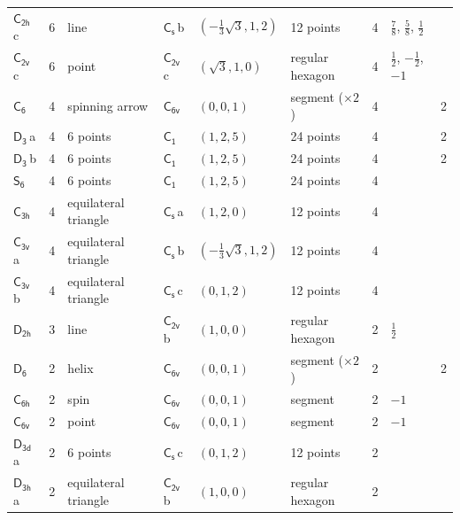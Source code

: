 \documentclass[10pt,a4paper]{article}
\numberwithin{equation}{section}
\newcommand{\grp}[1]{\mathsf{#1}}
\newcommand{\clsletter}[1]{\,{\scriptsize\color{black!55}#1}}
\newlength{\fillwidth}\newlength{\cellwidth}\newlength{\colwidth}
\begin{document}
{{\begin{longtable}{@{}lrllllr>{\RaggedRight\arraybackslash}p{\fillwidth}r@{}}
\href{C2h.pdf}{$\grp{C_{2h}}$}\clsletter{c} & 6 & line & \href{C1v.pdf}{$\grp{C_{s}}$}\clsletter{b} & $(-\tfrac{1}{3}\sqrt{3}, 1, 2)$ & 12 points & 4 & ${\tfrac{7}{8}}$, ${\tfrac{5}{8}}$, ${\tfrac{1}{2}}$ & \\
\href{C2v.pdf}{$\grp{C_{2v}}$}\clsletter{c} & 6 & point & \href{C2v.pdf}{$\grp{C_{2v}}$}\clsletter{c} & $(\sqrt{3}, 1, 0)$ & regular hexagon & 4 & ${\tfrac{1}{2}}$, ${-\tfrac{1}{2}}$, ${-1}$ & \\
\href{C6.pdf}{$\grp{C_{6}}$} & 4 & spinning arrow & \href{C6v.pdf}{$\grp{C_{6v}}$} & $(0, 0, 1)$ & segment (${\times}2$) & 4 &  & 2\\
\href{D3.pdf}{$\grp{D_{3}}$}\clsletter{a} & 4 & 6 points & \href{C1.pdf}{$\grp{C_{1}}$} & $(1, 2, 5)$ & 24 points & 4 &  & 2\\
\href{D3.pdf}{$\grp{D_{3}}$}\clsletter{b} & 4 & 6 points & \href{C1.pdf}{$\grp{C_{1}}$} & $(1, 2, 5)$ & 24 points & 4 &  & 2\\
\href{S6.pdf}{$\grp{S_{6}}$} & 4 & 6 points & \href{C1.pdf}{$\grp{C_{1}}$} & $(1, 2, 5)$ & 24 points & 4 &  & \\
\href{C3h.pdf}{$\grp{C_{3h}}$} & 4 & equilateral triangle & \href{C1v.pdf}{$\grp{C_{s}}$}\clsletter{a} & $(1, 2, 0)$ & 12 points & 4 &  & \\
\href{C3v.pdf}{$\grp{C_{3v}}$}\clsletter{a} & 4 & equilateral triangle & \href{C1v.pdf}{$\grp{C_{s}}$}\clsletter{b} & $(-\tfrac{1}{3}\sqrt{3}, 1, 2)$ & 12 points & 4 &  & \\
\href{C3v.pdf}{$\grp{C_{3v}}$}\clsletter{b} & 4 & equilateral triangle & \href{C1v.pdf}{$\grp{C_{s}}$}\clsletter{c} & $(0, 1, 2)$ & 12 points & 4 &  & \\
\href{D2h.pdf}{$\grp{D_{2h}}$} & 3 & line & \href{C2v.pdf}{$\grp{C_{2v}}$}\clsletter{b} & $(1, 0, 0)$ & regular hexagon & 2 & ${\tfrac{1}{2}}$ & \\
\href{D6.pdf}{$\grp{D_{6}}$} & 2 & helix & \href{C6v.pdf}{$\grp{C_{6v}}$} & $(0, 0, 1)$ & segment (${\times}2$) & 2 &  & 2\\
\href{C6h.pdf}{$\grp{C_{6h}}$} & 2 & spin & \href{C6v.pdf}{$\grp{C_{6v}}$} & $(0, 0, 1)$ & segment & 2 & ${-1}$ & \\
\href{C6v.pdf}{$\grp{C_{6v}}$} & 2 & point & \href{C6v.pdf}{$\grp{C_{6v}}$} & $(0, 0, 1)$ & segment & 2 & ${-1}$ & \\
\href{D3d.pdf}{$\grp{D_{3d}}$}\clsletter{a} & 2 & 6 points & \href{C1v.pdf}{$\grp{C_{s}}$}\clsletter{c} & $(0, 1, 2)$ & 12 points & 2 &  & \\
\href{D3h.pdf}{$\grp{D_{3h}}$}\clsletter{a} & 2 & equilateral triangle & \href{C2v.pdf}{$\grp{C_{2v}}$}\clsletter{b} & $(1, 0, 0)$ & regular hexagon & 2 &  & \\

\end{longtable}}}
\end{document}
